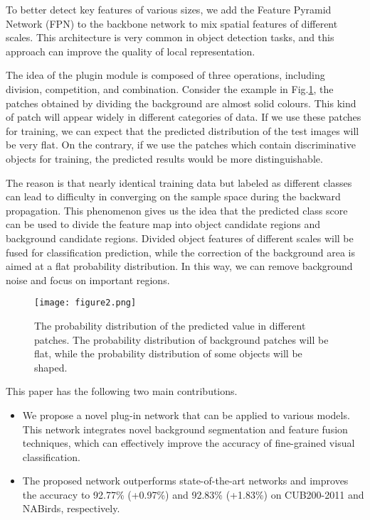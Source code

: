 \documentclass[conference]{IEEEtran}
\begin{document}
To better detect key features of various sizes, we add the Feature Pyramid Network (FPN)\cite{FPN} to the backbone network to mix spatial features of different scales. This architecture is very common in object detection tasks, and this approach can improve the quality of local representation. 

The idea of the plugin module is composed of three operations, including division, competition, and combination. Consider the example in Fig.\ref{fig2}, the patches obtained by dividing the background are almost solid colours. This kind of patch will appear widely in different categories of data. If we use these patches for training, we can expect that the predicted distribution of the test images will be very flat. On the contrary, if we use the patches which contain discriminative objects for training, the predicted results would be more distinguishable.

The reason is that nearly identical training data but labeled as different classes can lead to difficulty in converging on the sample space during the backward propagation. This phenomenon gives us the idea that the predicted class score can be used to divide the feature map into object candidate regions and background candidate regions. Divided object features of different scales will be fused for classification prediction, while the correction of the background area is aimed at a flat probability distribution. In this way, we can remove background noise and focus on important regions.

\begin{figure}
\centerline{\texttt{[image: figure2.png]}}
\caption{The probability distribution of the predicted value in different patches. The probability distribution of background patches will be flat, while the probability distribution of some objects will be shaped.}
\label{fig2}
\end{figure}

This paper has the following two main contributions.

\begin{itemize}
\item We propose a novel plug-in network that can be applied to various models. This network integrates novel background segmentation  and feature fusion techniques, which can effectively improve the accuracy of fine-grained visual classification.
\item The proposed network outperforms state-of-the-art networks and improves the accuracy to 92.77\% (+0.97\%) and 92.83\% (+1.83\%) on CUB200-2011\cite{CUB_200_2011} and NABirds\cite{NABirds}, respectively.
\end{itemize}
\end{document}
